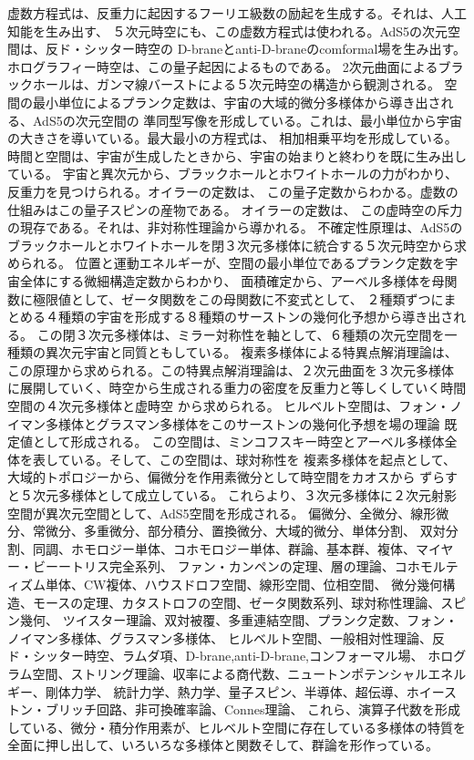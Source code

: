 \documentclass{jsarticle}
\begin{document}
{   虚数方程式は、反重力に起因するフーリエ級数の励起を生成する。それは、人工知能を生み出す、
   ５次元時空にも、この虚数方程式は使われる。AdS5の次元空間は、反ド・シッター時空の
   D-braneとanti-D-braneのcomformal場を生み出す。ホログラフィー時空は、この量子起因によるものである。
   2次元曲面によるブラックホールは、ガンマ線バーストによる５次元時空の構造から観測される。
   空間の最小単位によるプランク定数は、宇宙の大域的微分多様体から導き出される、AdS5の次元空間の
   準同型写像を形成している。これは、最小単位から宇宙の大きさを導いている。最大最小の方程式は、
   相加相乗平均を形成している。時間と空間は、宇宙が生成したときから、宇宙の始まりと終わりを既に生み出している。
   宇宙と異次元から、ブラックホールとホワイトホールの力がわかり、反重力を見つけられる。オイラーの定数は、
   この量子定数からわかる。虚数の仕組みはこの量子スピンの産物である。
   オイラーの定数は、 この虚時空の斥力の現存である。それは、非対称性理論から導かれる。
   不確定性原理は、AdS5のブラックホールとホワイトホールを閉３次元多様体に統合する５次元時空から求められる。
   位置と運動エネルギーが、空間の最小単位であるプランク定数を宇宙全体にする微細構造定数からわかり、
   面積確定から、アーベル多様体を母関数に極限値として、ゼータ関数をこの母関数に不変式として、
   ２種類ずつにまとめる４種類の宇宙を形成する８種類のサーストンの幾何化予想から導き出される。
   この閉３次元多様体は、ミラー対称性を軸として、６種類の次元空間を一種類の異次元宇宙と同質ともしている。
   複素多様体による特異点解消理論は、この原理から求められる。この特異点解消理論は、２次元曲面を３次元多様体
   に展開していく、時空から生成される重力の密度を反重力と等しくしていく時間空間の４次元多様体と虚時空
   から求められる。
   ヒルベルト空間は、フォン・ノイマン多様体とグラスマン多様体をこのサーストンの幾何化予想を場の理論
   既定値として形成される。
   この空間は、ミンコフスキー時空とアーベル多様体全体を表している。そして、この空間は、球対称性を
   複素多様体を起点として、大域的トポロジーから、偏微分を作用素微分として時空間をカオスから
   ずらすと５次元多様体として成立している。
   これらより、３次元多様体に２次元射影空間が異次元空間として、AdS5空間を形成される。
   偏微分、全微分、線形微分、常微分、多重微分、部分積分、置換微分、大域的微分、単体分割、
   双対分割、同調、ホモロジー単体、コホモロジー単体、群論、基本群、複体、マイヤー・ビーートリス完全系列、
   ファン・カンペンの定理、層の理論、コホモルティズム単体、CW複体、ハウスドロフ空間、線形空間、位相空間、
   微分幾何構造、モースの定理、カタストロフの空間、ゼータ関数系列、球対称性理論、スピン幾何、
   ツイスター理論、双対被覆、多重連結空間、プランク定数、フォン・ノイマン多様体、グラスマン多様体、
   ヒルベルト空間、一般相対性理論、反ド・シッター時空、ラムダ項、D-brane,anti-D-brane,コンフォーマル場、
   ホログラム空間、ストリング理論、収率による商代数、ニュートンポテンシャルエネルギー、剛体力学、
   統計力学、熱力学、量子スピン、半導体、超伝導、ホイーストン・ブリッチ回路、非可換確率論、Connes理論、
   これら、演算子代数を形成している、微分・積分作用素が、ヒルベルト空間に存在している多様体の特質を
   全面に押し出して、いろいろな多様体と関数そして、群論を形作っている。


}
\end{document}
